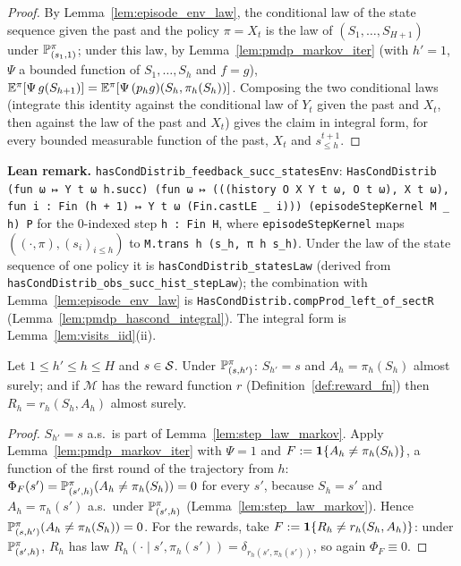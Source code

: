 \begin{proof}
\leanok
By Lemma~\ref{lem:episode_env_law}, the conditional law of the state sequence given the past and
the policy $\pi = X_t$ is the law of $(S_1, \dots, S_{H+1})$ under $\mathbb{P}^\pi_{(s_1, 1)}$; under this
law, by Lemma~\ref{lem:pmdp_markov_iter} (with $h' = 1$, $\Psi$ a bounded function of
$S_1, \dots, S_h$ and $f = g$), $\mathbb{E}^\pi[\Psi\, g(S_{h+1})] = \mathbb{E}^\pi[\Psi\,(p_h g)(S_h, \pi_h(S_h))]$.
Composing the two conditional laws (integrate this identity against the conditional law of
$Y_t$ given the past and $X_t$, then against the law of the past and $X_t$) gives the claim in
integral form, for every bounded measurable function of the past, $X_t$ and $s^{t+1}_{\le h}$.
\end{proof}

\textbf{Lean remark.} \texttt{hasCondDistrib\_feedback\_succ\_statesEnv}:
\texttt{HasCondDistrib (fun ω ↦ Y t ω h.succ) (fun ω ↦ (((history O X Y t ω, O t ω), X t ω), fun i : Fin (h + 1) ↦ Y t ω (Fin.castLE \_ i))) (episodeStepKernel M \_ h) P}
for the $0$-indexed step \texttt{h : Fin H}, where \texttt{episodeStepKernel} maps
$((\cdot, \pi), (s_i)_{i \le h})$ to \texttt{M.trans h (s\_h, π h s\_h)}. Under the law of the state
sequence of one policy it is \texttt{hasCondDistrib\_statesLaw} (derived from
\texttt{hasCondDistrib\_obs\_succ\_hist\_stepLaw}); the combination with
Lemma~\ref{lem:episode_env_law} is \texttt{HasCondDistrib.compProd\_left\_of\_sectR}
(Lemma~\ref{lem:pmdp_hascond_integral}). The integral form is Lemma~\ref{lem:visits_iid}(ii).

\begin{lemma}\label{lem:pmdp_action_eq_policy}
\leanok
{}
Let $1 \le h' \le h \le H$ and $s \in \mathcal{S}$. Under $\mathbb{P}^\pi_{(s,h')}$: $S_{h'} = s$ and
$A_h = \pi_h(S_h)$ almost surely; and if $\mathcal M$ has the reward function $r$
(Definition~\ref{def:reward_fn}) then $R_h = r_h(S_h, A_h)$ almost surely.
\end{lemma}

\begin{proof}
\leanok
$S_{h'} = s$ a.s.\ is part of Lemma~\ref{lem:step_law_markov}. Apply
Lemma~\ref{lem:pmdp_markov_iter} with $\Psi = 1$ and $F := \mathbf{1}\{A_h \ne \pi_h(S_h)\}$, a
function of the first round of the trajectory from $h$: $\Phi_F(s') = \mathbb{P}^\pi_{(s',h)}(A_h \ne \pi_h(S_h)) = 0$
for every $s'$, because $S_h = s'$ and $A_h = \pi_h(s')$ a.s.\ under $\mathbb{P}^\pi_{(s',h)}$
(Lemma~\ref{lem:step_law_markov}). Hence $\mathbb{P}^\pi_{(s,h')}(A_h \ne \pi_h(S_h)) = 0$. For the
rewards, take $F := \mathbf{1}\{R_h \ne r_h(S_h, A_h)\}$: under $\mathbb{P}^\pi_{(s',h)}$, $R_h$ has law
$R_h(\cdot \mid s', \pi_h(s')) = \delta_{r_h(s', \pi_h(s'))}$, so again $\Phi_F \equiv 0$.
\end{proof}

